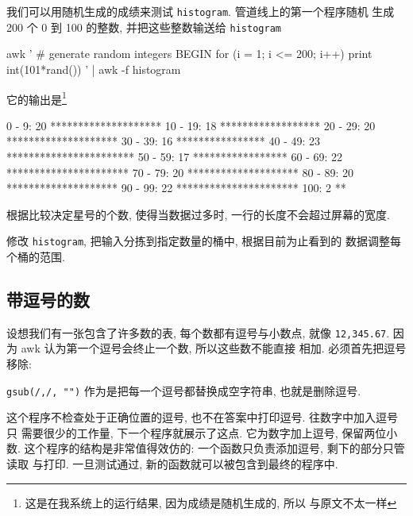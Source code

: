 我们可以用随机生成的成绩来测试 \verb'histogram'. 管道线上的第一个程序随机
生成 200 个 0 到 100 的整数, 并把这些整数输送给 \verb'histogram'
\begin{awkcode}
    awk '
    # generate random integers
    BEGIN { for (i = 1; i <= 200; i++)
                print int(101*rand())
          }
    ' |
    awk -f histogram
\end{awkcode}
它的输出是\footnote{这是在我系统上的运行结果, 因为成绩是随机生成的, 所以 
与原文不太一样}
\begin{shell}
      0 -  9:  20 ********************
     10 - 19:  18 ******************
     20 - 29:  20 ********************
     30 - 39:  16 ****************
     40 - 49:  23 ***********************
     50 - 59:  17 *****************
     60 - 69:  22 **********************
     70 - 79:  20 ********************
     80 - 89:  20 ********************
     90 - 99:  22 **********************
    100:        2 **
\end{shell}

\begin{exercise}
    根据比较决定星号的个数, 使得当数据过多时, 一行的长度不会超过屏幕的宽度.
\end{exercise}

\begin{exercise}
    修改 \verb'histogram', 把输入分拣到指定数量的桶中, 根据目前为止看到的
    数据调整每个桶的范围.
\end{exercise}

\subsection{带逗号的数}
\label{subsec:numbers_with_commas}

设想我们有一张包含了许多数的表, 每个数都有逗号与小数点, 就像
\verb'12,345.67'. 因为 awk 认为第一个逗号会终止一个数, 所以这些数不能直接
相加. 必须首先把逗号移除:
\verb'gsub(/,/, "")' 作为是把每一个逗号都替换成空字符串, 也就是删除逗号.

这个程序不检查处于正确位置的逗号, 也不在答案中打印逗号. 往数字中加入逗号只
需要很少的工作量, 下一个程序就展示了这点. 它为数字加上逗号, 保留两位小数.
这个程序的结构是非常值得效仿的: 一个函数只负责添加逗号, 剩下的部分只管读取
与打印. 一旦测试通过, 新的函数就可以被包含到最终的程序中.


